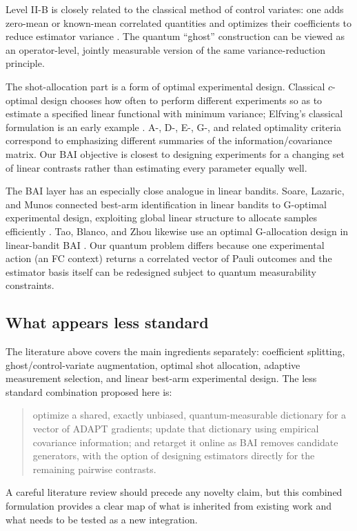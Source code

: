 \documentclass[11pt]{article}
\begin{document}
Level II-B is closely related to the classical method of control variates: one adds zero-mean or known-mean correlated quantities and optimizes their coefficients to reduce estimator variance \cite{GlynnSzechtman2002}.  The quantum ``ghost'' construction can be viewed as an operator-level, jointly measurable version of the same variance-reduction principle.

The shot-allocation part is a form of optimal experimental design.  Classical $c$-optimal design chooses how often to perform different experiments so as to estimate a specified linear functional with minimum variance; Elfving's classical formulation is an early example \cite{Elfving1952}.  A-, D-, E-, G-, and related optimality criteria correspond to emphasizing different summaries of the information/covariance matrix.  Our BAI objective is closest to designing experiments for a changing set of linear contrasts rather than estimating every parameter equally well.

The BAI layer has an especially close analogue in linear bandits.  Soare, Lazaric, and Munos connected best-arm identification in linear bandits to G-optimal experimental design, exploiting global linear structure to allocate samples efficiently \cite{Soare2014}.  Tao, Blanco, and Zhou likewise use an optimal G-allocation design in linear-bandit BAI \cite{Tao2018}.  Our quantum problem differs because one experimental action (an FC context) returns a correlated vector of Pauli outcomes and the estimator basis itself can be redesigned subject to quantum measurability constraints.

\subsection{What appears less standard}

The literature above covers the main ingredients separately: coefficient splitting, ghost/control-variate augmentation, optimal shot allocation, adaptive measurement selection, and linear best-arm experimental design.  The less standard combination proposed here is:
\begin{quote}
optimize a shared, exactly unbiased, quantum-measurable dictionary for a vector of ADAPT gradients; update that dictionary using empirical covariance information; and retarget it online as BAI removes candidate generators, with the option of designing estimators directly for the remaining pairwise contrasts.
\end{quote}
A careful literature review should precede any novelty claim, but this combined formulation provides a clear map of what is inherited from existing work and what needs to be tested as a new integration.
\end{document}
